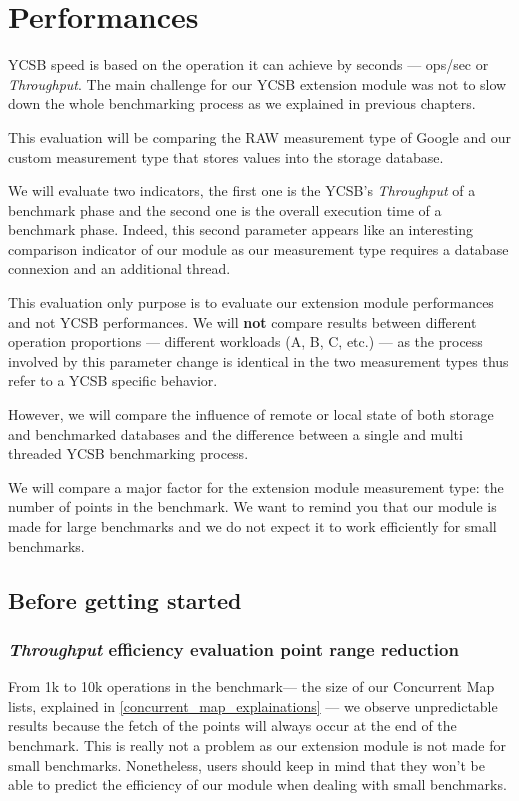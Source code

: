 \documentclass[a4paper,11pt]{report}
\begin{document}
\section{Performances}

YCSB speed is based on the operation it can achieve by seconds --- ops/sec or \textit{Throughput}. The main challenge for our YCSB extension module was not to slow down the whole benchmarking process as we explained in previous chapters.

This evaluation will be comparing the RAW measurement type of Google and our custom measurement type that stores values into the storage database.

We will evaluate two indicators, the first one is the YCSB's \textit{Throughput} of a benchmark phase and the second one is the overall execution time of a benchmark phase. Indeed, this second parameter appears like an interesting comparison indicator of our module as our measurement type requires a database connexion and an additional thread.

\bigskip

This evaluation only purpose is to evaluate our extension module performances and not YCSB performances. We will \textbf{not} compare results between different operation proportions --- different workloads (A, B, C, etc.) --- as the process involved by this parameter change is identical in the two measurement types thus refer to a YCSB specific behavior.

However, we will compare the influence of remote or local state of both storage and benchmarked databases and the difference between a single and multi threaded YCSB benchmarking process. 

We will compare a major factor for the extension module measurement type: the number of points in the benchmark. We want to remind you that our module is made for large benchmarks and we do not expect it to work efficiently for small benchmarks.

\subsection{Before getting started}

\subsubsection{\textit{Throughput} efficiency evaluation point range reduction}

From 1k to 10k operations in the benchmark--- the size of our Concurrent Map lists, explained in \ref{concurrent_map_explainations} --- we observe unpredictable results because the fetch of the points will always occur at the end of the benchmark. This is really not a problem as our extension module is not made for small benchmarks. Nonetheless, users should keep in mind that they won't be able to predict the efficiency of our module when dealing with small benchmarks.
\end{document}

